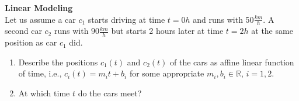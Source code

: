 \textbf{Linear Modeling}\\
Let us assume a car $c_1$ starts driving at time $t=0h$ and runs with 50$\frac{km}{h}$. A second car $c_2$ runs with $90\frac{km}{h}$ but starts 2 hours later at time $t=2h$ at the same position as car $c_1$ did.
\begin{enumerate}
	\item Describe the positions $c_1(t)$ and $c_2(t)$ of the cars as affine linear function of time, i.e., $c_i(t) = m_i t + b_i$ for some appropriate $m_i, b_i \in \mathbb{R}$, $i = 1,2$.
	\item At which time $t$ do the cars meet? 
\end{enumerate}